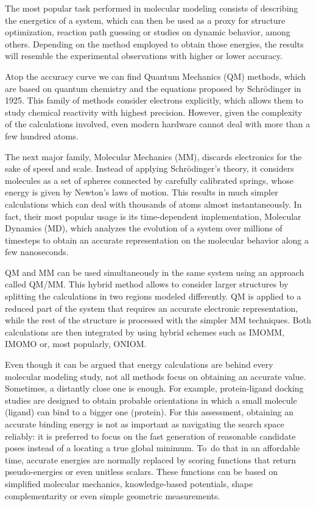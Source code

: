 The most popular task performed in molecular modeling consists of describing the energetics of a system, which can then be used as a proxy for structure optimization, reaction path guessing or studies on dynamic behavior, among others. Depending on the method employed to obtain those energies, the results will resemble the experimental observations with higher or lower accuracy.

Atop the accuracy curve we can find Quantum Mechanics (QM) methods, which are based on quantum chemistry and the equations proposed by Schrödinger in 1925. This family of methods consider electrons explicitly, which allows them to study chemical reactivity with highest precision. However, given the complexity of the calculations involved, even modern hardware cannot deal with more than a few hundred atoms.

The next major family, Molecular Mechanics (MM), discards electronics for the sake of speed and scale. Instead of applying Schrödinger’s theory, it considers molecules as a set of spheres connected by carefully calibrated springs, whose energy is given by Newton’s laws of motion. This results in much simpler calculations which can deal with thousands of atoms almost instantaneously. In fact, their most popular usage is its time-dependent implementation, Molecular Dynamics (MD), which analyzes the evolution of a system over millions of timesteps to obtain an accurate representation on the molecular behavior along a few nanoseconds.

QM and MM can be used simultaneously in the same system using an approach called QM/MM. This hybrid method allows to consider larger structures by splitting the calculations in two regions modeled differently. QM is applied to a reduced part of the system that requires an accurate electronic representation, while the rest of the structure is processed with the simpler MM techniques. Both calculations are then integrated by using hybrid schemes such as IMOMM,\cite{maseras1995imomm} IMOMO\cite{humbel1996imomo} or, most popularly, ONIOM.\cite{svensson1996oniom}

Even though it can be argued that energy calculations are behind every molecular modeling study, not all methods focus on obtaining an accurate value. Sometimes, a distantly close one is enough. For example, protein-ligand docking studies are designed to obtain probable orientations in which a small molecule (ligand) can bind to a bigger one (protein). For this assessment, obtaining an accurate binding energy is not as important as navigating the search space reliably: it is preferred to focus on the fast generation of reasonable candidate poses instead of a locating a true global minimum. To\ do that in an affordable time, accurate energies are normally replaced by scoring functions that return pseudo-energies or even unitless scalars. These functions can be based on simplified molecular mechanics, knowledge-based potentials, shape complementarity or even simple geometric measurements.


